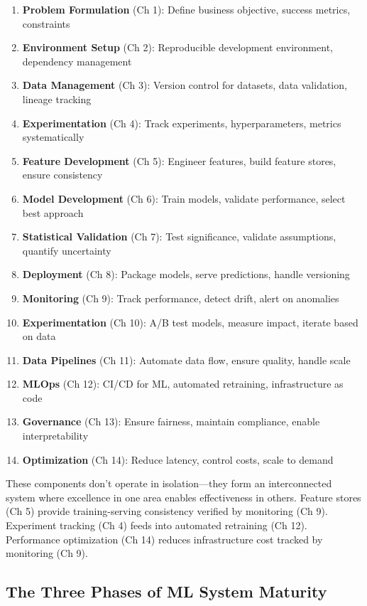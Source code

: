 \begin{enumerate}
    \item \textbf{Problem Formulation} (Ch 1): Define business objective, success metrics, constraints
    \item \textbf{Environment Setup} (Ch 2): Reproducible development environment, dependency management
    \item \textbf{Data Management} (Ch 3): Version control for datasets, data validation, lineage tracking
    \item \textbf{Experimentation} (Ch 4): Track experiments, hyperparameters, metrics systematically
    \item \textbf{Feature Development} (Ch 5): Engineer features, build feature stores, ensure consistency
    \item \textbf{Model Development} (Ch 6): Train models, validate performance, select best approach
    \item \textbf{Statistical Validation} (Ch 7): Test significance, validate assumptions, quantify uncertainty
    \item \textbf{Deployment} (Ch 8): Package models, serve predictions, handle versioning
    \item \textbf{Monitoring} (Ch 9): Track performance, detect drift, alert on anomalies
    \item \textbf{Experimentation} (Ch 10): A/B test models, measure impact, iterate based on data
    \item \textbf{Data Pipelines} (Ch 11): Automate data flow, ensure quality, handle scale
    \item \textbf{MLOps} (Ch 12): CI/CD for ML, automated retraining, infrastructure as code
    \item \textbf{Governance} (Ch 13): Ensure fairness, maintain compliance, enable interpretability
    \item \textbf{Optimization} (Ch 14): Reduce latency, control costs, scale to demand
\end{enumerate}

These components don't operate in isolation---they form an interconnected system where excellence in one area enables effectiveness in others. Feature stores (Ch 5) provide training-serving consistency verified by monitoring (Ch 9). Experiment tracking (Ch 4) feeds into automated retraining (Ch 12). Performance optimization (Ch 14) reduces infrastructure cost tracked by monitoring (Ch 9).

\subsection{The Three Phases of ML System Maturity}

